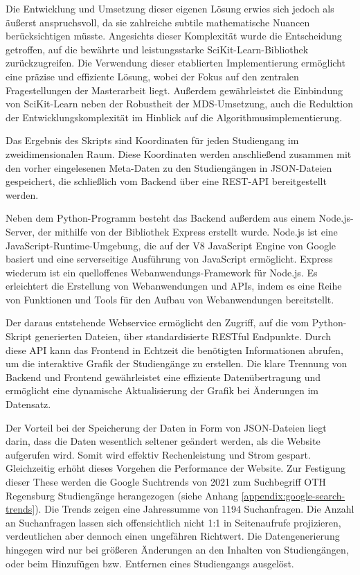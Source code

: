 Die Entwicklung und Umsetzung dieser eigenen Lösung erwies
sich jedoch als äußerst anspruchsvoll, da sie zahlreiche subtile mathematische
Nuancen berücksichtigen müsste. Angesichts dieser Komplexität wurde die
Entscheidung getroffen, auf die bewährte und leistungsstarke
SciKit-Learn-Bibliothek zurückzugreifen. Die Verwendung dieser etablierten
Implementierung ermöglicht eine präzise und effiziente Lösung, wobei der Fokus
auf den zentralen Fragestellungen der Masterarbeit liegt. Außerdem gewährleistet
die Einbindung von SciKit-Learn neben der Robustheit der MDS-Umsetzung, auch die
Reduktion der Entwicklungskomplexität im Hinblick auf die
Algorithmusimplementierung. \parencite{scikit-learn}

Das Ergebnis des Skripts sind Koordinaten für jeden Studiengang im
zweidimensionalen Raum. Diese Koordinaten werden anschließend zusammen mit den
vorher eingelesenen Meta-Daten zu den Studiengängen in JSON-Dateien gespeichert,
die schließlich vom Backend über eine REST-API bereitgestellt werden.

Neben dem Python-Programm besteht das Backend außerdem aus einem Node.js-Server,
der mithilfe von der Bibliothek Express erstellt wurde. Node.js ist eine
JavaScript-Runtime-Umgebung, die auf der V8 JavaScript Engine von Google basiert
und eine serverseitige Ausführung von JavaScript ermöglicht. \parencite{nodejs}
Express wiederum ist ein quelloffenes Webanwendungs-Framework für Node.js. Es
erleichtert die Erstellung von Webanwendungen und APIs, indem es eine Reihe von
Funktionen und Tools für den Aufbau von Webanwendungen bereitstellt.
\parencite{express}

Der daraus entstehende Webservice ermöglicht den Zugriff, auf die vom
Python-Skript generierten Dateien, über standardisierte RESTful Endpunkte. Durch
diese API kann das Frontend in Echtzeit die benötigten Informationen abrufen, um
die interaktive Grafik der Studiengänge zu erstellen. Die klare Trennung von
Backend und Frontend gewährleistet eine effiziente Datenübertragung und
ermöglicht eine dynamische Aktualisierung der Grafik bei Änderungen im
Datensatz.

Der Vorteil bei der Speicherung der Daten in Form von JSON-Dateien liegt darin,
dass die Daten wesentlich seltener geändert werden, als die Website aufgerufen
wird. Somit wird effektiv Rechenleistung und Strom gespart. Gleichzeitig erhöht
dieses Vorgehen die Performance der Website. Zur Festigung dieser These werden
die Google Suchtrends von 2021 zum Suchbegriff \glqq OTH Regensburg
Studiengänge\grqq{} herangezogen (siehe Anhang
\ref{appendix:google-search-trends}). Die Trends zeigen eine Jahressumme von
1194 Suchanfragen. Die Anzahl an Suchanfragen lassen sich offensichtlich nicht
1:1 in Seitenaufrufe projizieren, verdeutlichen aber dennoch einen ungefähren
Richtwert. Die Datengenerierung hingegen wird nur bei größeren Änderungen an den
Inhalten von Studiengängen, oder beim Hinzufügen bzw. Entfernen eines 
Studiengangs ausgelöst.

